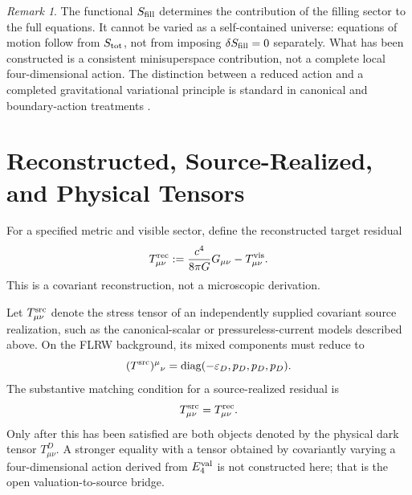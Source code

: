 \documentclass[11pt,a4paper]{article}
\numberwithin{equation}{section}
\theoremstyle{definition}
\theoremstyle{plain}
\theoremstyle{remark}
\newtheorem{remark}[criterion]{Remark}
\newcommand{\Efour}{E_4}
\newcommand{\epsD}{\varepsilon_D}
\newcommand{\pD}{p_D}
\newcommand{\diag}{\operatorname{diag}}
\begin{document}
\begin{remark}
The functional \(S_{\rm fill}\) determines the contribution of the filling sector to the full equations. It cannot be varied as a self-contained universe: equations of motion follow from \(S_{\rm tot}\), not from imposing \(\delta S_{\rm fill}=0\) separately. What has been constructed is a consistent minisuperspace contribution, not a complete local four-dimensional action. The distinction between a reduced action and a completed gravitational variational principle is standard in canonical and boundary-action treatments \cite{DeWitt1967,GibbonsHawking1977}.
\end{remark}

\section{Reconstructed, Source-Realized, and Physical Tensors}
For a specified metric and visible sector, define the reconstructed target residual
\begin{equation}
T^{\rm rec}_{\mu\nu}:=\frac{c^4}{8\pi G}G_{\mu\nu}-T^{\rm vis}_{\mu\nu}.
\end{equation}
This is a covariant reconstruction, not a microscopic derivation.

Let \(T^{\rm src}_{\mu\nu}\) denote the stress tensor of an independently supplied covariant source realization, such as the canonical-scalar or pressureless-current models described above. On the FLRW background, its mixed components must reduce to
\begin{equation}
(T^{\rm src})^{\mu}{}_{\nu}=\diag(-\epsD,\pD,\pD,\pD).
\end{equation}
The substantive matching condition for a source-realized residual is
\begin{equation}
T^{\rm src}_{\mu\nu}=T^{\rm rec}_{\mu\nu}.
\end{equation}
Only after this has been satisfied are both objects denoted by the physical dark tensor \(T^D_{\mu\nu}\). A stronger equality with a tensor obtained by covariantly varying a four-dimensional action derived from \(\Efour^{\rm val}\) is not constructed here; that is the open valuation-to-source bridge.
\end{document}
